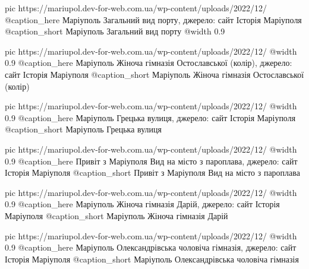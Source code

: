 	pic https://mariupol.dev-for-web.com.ua/wp-content/uploads/2022/12/%
	@caption_here Маріуполь Загальний вид порту, джерело: сайт Історія Маріуполя
	@caption_short Маріуполь Загальний вид порту
	@width 0.9

	pic https://mariupol.dev-for-web.com.ua/wp-content/uploads/2022/12/%
	@width 0.9
	@caption_here Маріуполь Жіноча гімназія Остославської (колір), джерело: сайт Історія Маріуполя
	@caption_short Маріуполь Жіноча гімназія Остославської (колір)

	pic https://mariupol.dev-for-web.com.ua/wp-content/uploads/2022/12/%
	@width 0.9
	@caption_here Маріуполь Грецька вулиця, джерело: сайт Історія Маріуполя
	@caption_short Маріуполь Грецька вулиця

	pic https://mariupol.dev-for-web.com.ua/wp-content/uploads/2022/12/%
	@width 0.9
	@caption_here Привіт з Маріуполя Вид на місто з пароплава, джерело: сайт Історія Маріуполя
	@caption_short Привіт з Маріуполя Вид на місто з пароплава

	pic https://mariupol.dev-for-web.com.ua/wp-content/uploads/2022/12/%
	@width 0.9
	@caption_here Маріуполь Жіноча гімназія Дарій, джерело: сайт Історія Маріуполя
	@caption_short Маріуполь Жіноча гімназія Дарій

	pic https://mariupol.dev-for-web.com.ua/wp-content/uploads/2022/12/%
	@width 0.9
	@caption_here Маріуполь Олександрівська чоловіча гімназія, джерело: сайт Історія Маріуполя
	@caption_short Маріуполь Олександрівська чоловіча гімназія

